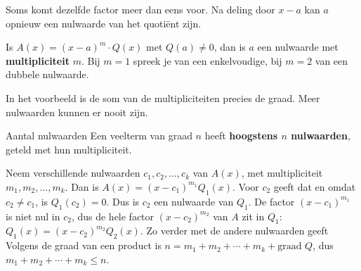 Soms komt dezelfde factor meer dan eens voor. Na deling door $x - a$ kan $a$ opnieuw een nulwaarde van het quotiënt zijn.

\begin{theorie}
Is $A(x) = (x - a)^m \cdot Q(x)$ met $Q(a) \neq 0$, dan is $a$ een nulwaarde met \textbf{\textcolor{accent}{multipliciteit}} $m$. Bij $m = 1$ spreek je van een enkelvoudige, bij $m = 2$ van een dubbele nulwaarde.
\end{theorie}


\begin{oefeningen}
\end{oefeningen}

In het voorbeeld is de som van de multipliciteiten precies de graad. Meer nulwaarden kunnen er nooit zijn.

\begin{theorie}
\begin{stelling}{Aantal nulwaarden}
Een veelterm van graad $n$ heeft \textbf{\textcolor{accent}{hoogstens $n$ nulwaarden}}, geteld met hun multipliciteit.
\end{stelling}

\begin{bewijs}
Neem verschillende nulwaarden $c_1, c_2, \ldots, c_k$ van $A(x)$, met multipliciteit $m_1, m_2, \ldots, m_k$. Dan is $A(x) = (x - c_1)^{m_1}Q_1(x)$. Voor $c_2$ geeft dat
en omdat $c_2 \neq c_1$, is $Q_1(c_2) = 0$. Dus is $c_2$ een nulwaarde van $Q_1$. De factor $(x - c_1)^{m_1}$ is niet nul in $c_2$, dus de hele factor $(x - c_2)^{m_2}$ van $A$ zit in $Q_1$: \ $Q_1(x) = (x - c_2)^{m_2}Q_2(x)$. Zo verder met de andere nulwaarden geeft
Volgens de graad van een product is $n = m_1 + m_2 + \cdots + m_k + \text{graad } Q$, dus $m_1 + m_2 + \cdots + m_k \leqslant n$.
\end{bewijs}
\end{theorie}

